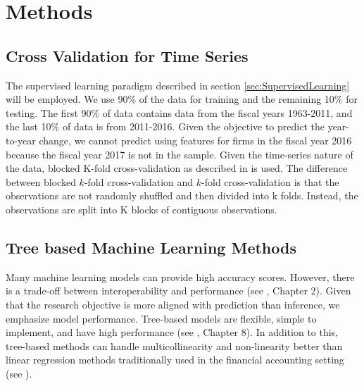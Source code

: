 \section{Methods}

\subsection{Cross Validation for Time Series} \label{sec:CV-TS}
The supervised learning paradigm described in section \ref{sec:SupervisedLearning} will be employed.  We use 90\% of the data for training and the remaining 10\% for testing. The first 90\% of data contains data from the fiscal years 1963-2011, and the last 10\% of data is from 2011-2016.  Given the objective to predict the year-to-year change, we cannot predict using features for firms in the fiscal year 2016 because the fiscal year 2017 is not in the sample. Given the time-series nature of the data, blocked K-fold cross-validation as described in \cite{cerqueira2019evaluating} is used. The difference between blocked \(k\)-fold cross-validation and \(k\)-fold cross-validation is that the observations are not randomly shuffled and then divided into k folds. Instead, the observations are split into K blocks of contiguous observations. 


\subsection{Tree based Machine Learning Methods}

Many machine learning models can provide high accuracy scores. However, there is a trade-off between interoperability and performance (see  \cite{ISL}, Chapter 2).  Given that the research objective is more aligned with prediction than inference, we emphasize model performance. Tree-based models are flexible, simple to implement, and have high performance (see \cite{ISL},  Chapter 8). In addition to this, tree-based methods can handle multicollinearity and non-linearity better than linear regression methods traditionally used in the financial accounting setting (see \cite{Monahan}).  

